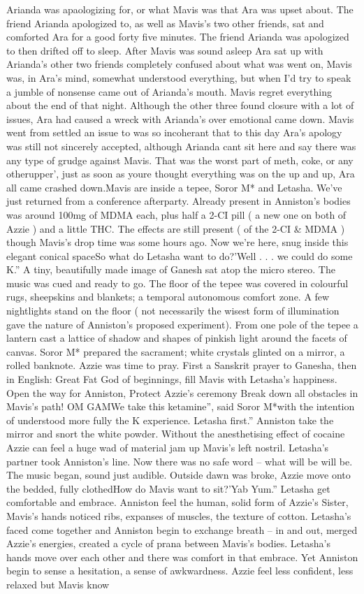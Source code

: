 \documentclass[12pt]{book}
\begin{document}
Arianda was apaologizing for, or what Mavis was that Ara was upset about. The friend Arianda apologized to, as well as Mavis's two other friends, sat and comforted Ara for a good forty five minutes. The friend Arianda was apologized to then drifted off to sleep. After Mavis was sound asleep Ara sat up with Arianda's other two friends completely confused about what was went on, Mavis was, in Ara's mind, somewhat understood everything, but when I'd try to speak a jumble of nonsense came out of Arianda's mouth. Mavis regret everything about the end of that night. Although the other three found closure with a lot of issues, Ara had caused a wreck with Arianda's over emotional came down. Mavis went from settled an issue to was so incoherant that to this day Ara's apology was still not sincerely accepted, although Arianda cant sit here and say there was any type of grudge against Mavis. That was the worst part of meth, coke, or any otherupper', just as soon as youre thought everything was on the up and up, Ara all came crashed down.Mavis are inside a tepee, Soror M* and Letasha. We've just returned from a conference afterparty. Already present in Anniston's bodies was around 100mg of MDMA each, plus half a 2-CI pill ( a new one on both of Azzie ) and a little THC. The effects are still present ( of the 2-CI \& MDMA ) though Mavis's drop time was some hours ago. Now we're here, snug inside this elegant conical spaceSo what do Letasha want to do?'Well . . . we could do some K.'' A tiny, beautifully made image of Ganesh sat atop the micro stereo. The music was cued and ready to go. The floor of the tepee was covered in colourful rugs, sheepskins and blankets; a temporal autonomous comfort zone. A few nightlights stand on the floor ( not necessarily the wisest form of illumination gave the nature of Anniston's proposed experiment). From one pole of the tepee a lantern cast a lattice of shadow and shapes of pinkish light around the facets of canvas. Soror M* prepared the sacrament; white crystals glinted on a mirror, a rolled banknote. Azzie was time to pray. First a Sanskrit prayer to Ganesha, then in English: Great Fat God of beginnings, fill Mavis with Letasha's happiness. Open the way for Anniston, Protect Azzie's ceremony Break down all obstacles in Mavis's path! OM GAMWe take this ketamine'', said Soror M*with the intention of understood more fully the K experience. Letasha first.'' Anniston take the mirror and snort the white powder. Without the anesthetising effect of cocaine Azzie can feel a huge wad of material jam up Mavis's left nostril. Letasha's partner took Anniston's line. Now there was no safe word -- what will be will be. The music began, sound just audible. Outside dawn was broke, Azzie move onto the bedded, fully clothedHow do Mavis want to sit?'Yab Yum.'' Letasha get comfortable and embrace. Anniston feel the human, solid form of Azzie's Sister, Mavis's hands noticed ribs, expanses of muscles, the texture of cotton. Letasha's faced come together and Anniston begin to exchange breath -- in and out, merged Azzie's energies, created a cycle of prana between Mavis's bodies. Letasha's hands move over each other and there was comfort in that embrace. Yet Anniston begin to sense a hesitation, a sense of awkwardness. Azzie feel less confident, less relaxed but Mavis know 
\end{document}
